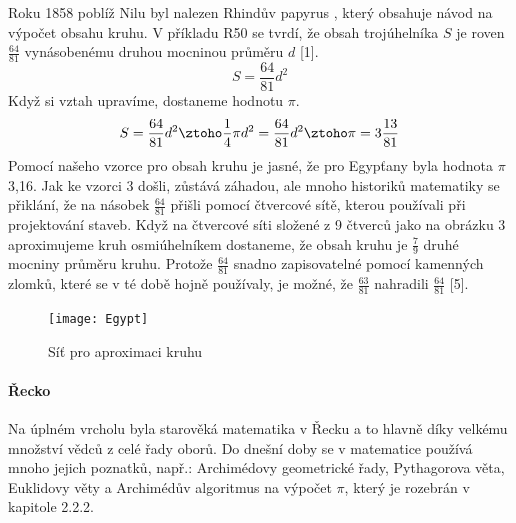 \documentclass[rocnikovka]{gzwroc} %
\begin{document}
Roku 1858 poblíž Nilu byl nalezen Rhindův papyrus , který obsahuje návod na výpočet obsahu kruhu. V příkladu R50 se tvrdí, že obsah trojúhelníka $S$ je roven $\frac{64}{81}$ vynásobenému druhou mocninou průměru $d$ [1].
\begin{equation}
S=\frac{64}{81}d^2
\end{equation}
Když si vztah upravíme, dostaneme hodnotu $\pi$.
$$
S=\frac{64}{81}d^2 \ztoho \frac{1}{4}\pi d^2=\frac{64}{81}d^2 \ztoho \pi=3\frac{13}{81}
$$
Pomocí našeho vzorce pro obsah kruhu je jasné, že pro Egypťany byla hodnota $\pi$ 3,16. Jak ke vzorci 3 došli, zůstává záhadou, ale mnoho historiků matematiky se přiklání, že na násobek $\frac{64}{81}$ přišli pomocí čtvercové sítě, kterou používali při projektování staveb. Když na čtvercové síti složené z 9 čtverců jako na obrázku 3 aproximujeme kruh osmiúhelníkem dostaneme, že obsah kruhu je $\frac{7}{9}$ druhé mocniny průměru kruhu. Protože $\frac{64}{81}$ snadno zapisovatelné pomocí kamenných zlomků, které se v té době hojně používaly, je možné, že $\frac{63}{81}$ nahradili $\frac{64}{81}$ [5].
\begin{figure}[!ht]
\texttt{[image: Egypt]}
\caption{Síť pro aproximaci kruhu}
\label{fig:kruh}
\end{figure}
\paragraph{Řecko}
Na úplném vrcholu byla starověká matematika v Řecku a to hlavně díky velkému množství vědců z celé řady oborů. Do dnešní doby se v matematice používá mnoho jejich poznatků, např.: Archimédovy geometrické řady, Pythagorova věta, Euklidovy věty a Archimédův algoritmus na výpočet $\pi$, který je rozebrán v kapitole 2.2.2.
\end{document}
